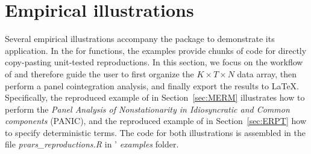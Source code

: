 
\section{Empirical illustrations} \label{sec:Illustration}
Several empirical illustrations accompany the package to demonstrate its application. 
In the  for functions, the examples provide chunks of  code for directly copy-pasting unit-tested reproductions. 
In this section, we focus on the workflow of  and therefore guide the user to first organize the $ K \times T \times N  $ data array, then perform a panel cointegration analysis, and finally export the results to LaTeX. Specifically, the reproduced example of \citet{OersalArsova2017} in Section~\ref{sec:MERM} illustrates how to perform the \textit{Panel Analysis of Nonstationarity in Idiosyncratic and Common components} (PANIC), and the reproduced example of \citet{ArsovaOersal2021} in Section~\ref{sec:ERPT} how to specify deterministic terms. The  code for both illustrations is assembled in the file \textit{pvars\_reproductions.R} in ' \textit{examples} folder. 


